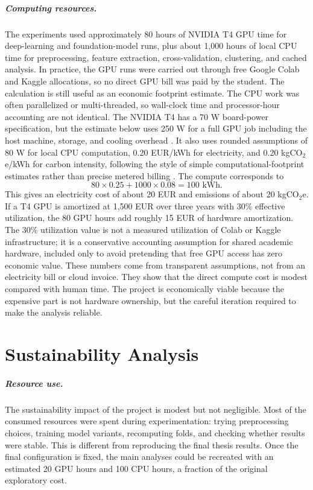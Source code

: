 \documentclass[11pt,a4paper,chapterprefix=false,parskip=false]{scrreprt}
\begin{document}
\begin{appendices}
    \paragraph{Computing resources.}
    The experiments used approximately 80 hours of NVIDIA T4 GPU time for deep-learning and foundation-model runs, plus about 1,000 hours of local CPU time for preprocessing, feature extraction, cross-validation, clustering, and cached analysis. In practice, the GPU runs were carried out through free Google Colab and Kaggle allocations, so no direct GPU bill was paid by the student. The calculation is still useful as an economic footprint estimate. The CPU work was often parallelized or multi-threaded, so wall-clock time and processor-hour accounting are not identical. The NVIDIA T4 has a 70 W board-power specification, but the estimate below uses 250 W for a full GPU job including the host machine, storage, and cooling overhead \citep{nvidia_t4_product_brief}. It also uses rounded assumptions of 80 W for local CPU computation, 0.20 EUR/kWh for electricity, and 0.20 kgCO$_2$e/kWh for carbon intensity, following the style of simple computational-footprint estimates rather than precise metered billing \citep{lannelongue_green_2021, eurostat_electricity_prices, ember_yearly_electricity_data}. The compute corresponds to
    \[
        80 \times 0.25 + 1000 \times 0.08 = 100 \text{ kWh}.
    \]
    This gives an electricity cost of about 20 EUR and emissions of about 20 kgCO$_2$e. If a T4 GPU is amortized at 1,500 EUR over three years with 30\% effective utilization, the 80 GPU hours add roughly 15 EUR of hardware amortization. The 30\% utilization value is not a measured utilization of Colab or Kaggle infrastructure; it is a conservative accounting assumption for shared academic hardware, included only to avoid pretending that free GPU access has zero economic value. These numbers come from transparent assumptions, not from an electricity bill or cloud invoice. They show that the direct compute cost is modest compared with human time. The project is economically viable because the expensive part is not hardware ownership, but the careful iteration required to make the analysis reliable.

    \chapter{Sustainability Analysis}
    \label{app:sustainability}
    \paragraph{Resource use.}
    The sustainability impact of the project is modest but not negligible. Most of the consumed resources were spent during experimentation: trying preprocessing choices, training model variants, recomputing folds, and checking whether results were stable. This is different from reproducing the final thesis results. Once the final configuration is fixed, the main analyses could be recreated with an estimated 20 GPU hours and 100 CPU hours, a fraction of the original exploratory cost.


\end{appendices}
\end{document}
